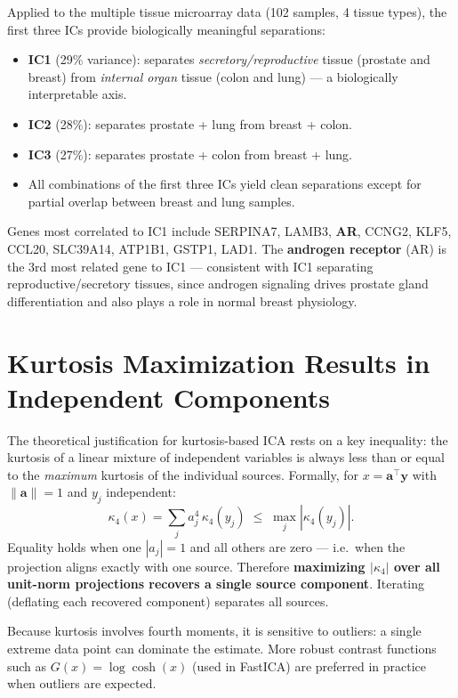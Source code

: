 \documentclass[11pt, oneside]{book}
\newcommand{\T}{^{\top}}
\begin{document}
Applied to the multiple tissue microarray data (102 samples, 4 tissue types), the
first three ICs provide biologically meaningful separations:
\begin{itemize}
  \item \textbf{IC1} (29\% variance): separates \emph{secretory/reproductive} tissue
        (prostate and breast) from \emph{internal organ} tissue (colon and lung) ---
        a biologically interpretable axis.
  \item \textbf{IC2} (28\%): separates prostate + lung from breast + colon.
  \item \textbf{IC3} (27\%): separates prostate + colon from breast + lung.
  \item All combinations of the first three ICs yield clean separations except for
        partial overlap between breast and lung samples.
\end{itemize}
Genes most correlated to IC1 include SERPINA7, LAMB3, \textbf{AR}, CCNG2, KLF5, CCL20,
SLC39A14, ATP1B1, GSTP1, LAD1.
The \textbf{androgen receptor} (AR) is the 3rd most related gene to IC1 --- consistent
with IC1 separating reproductive/secretory tissues, since androgen signaling drives
prostate gland differentiation and also plays a role in normal breast physiology.


\section{Kurtosis Maximization Results in Independent Components}

The theoretical justification for kurtosis-based ICA rests on a key inequality:
the kurtosis of a linear mixture of independent variables is always less than or equal
to the \emph{maximum} kurtosis of the individual sources.
Formally, for $x = \bm{a}\T\bm{y}$ with $\|\bm{a}\| = 1$ and $y_j$ independent:
\[
  \kappa_4(x) = \sum_j a_j^4\,\kappa_4(y_j) \;\leq\; \max_j |\kappa_4(y_j)|.
\]
Equality holds when one $|a_j| = 1$ and all others are zero --- i.e.\ when the
projection aligns exactly with one source.
Therefore \textbf{maximizing $|\kappa_4|$ over all unit-norm projections recovers a
single source component}.
Iterating (deflating each recovered component) separates all sources.

\begin{notebox}[title={Limitations of kurtosis}]
Because kurtosis involves fourth moments, it is sensitive to outliers: a single
extreme data point can dominate the estimate.
More robust contrast functions such as $G(x) = \log\cosh(x)$ (used in FastICA) are
preferred in practice when outliers are expected.
\end{notebox}
\end{document}
